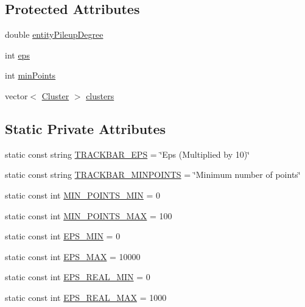 \subsection*{Protected Attributes}
\begin{DoxyCompactItemize}
\item 
double \hyperlink{classmultiscale_1_1analysis_1_1ClusterDetector_aaa93a4b3a5a3c4279aa434669093ac40}{entity\-Pileup\-Degree}
\item 
int \hyperlink{classmultiscale_1_1analysis_1_1ClusterDetector_a61e876f87d62245eada8f56d587d39cd}{eps}
\item 
int \hyperlink{classmultiscale_1_1analysis_1_1ClusterDetector_aa94df1adc462be5931ec25ba24122fe9}{min\-Points}
\item 
vector$<$ \hyperlink{classmultiscale_1_1analysis_1_1Cluster}{Cluster} $>$ \hyperlink{classmultiscale_1_1analysis_1_1ClusterDetector_aa81a8649bc743389c2fc1919d47eb5b3}{clusters}
\end{DoxyCompactItemize}
\subsection*{Static Private Attributes}
\begin{DoxyCompactItemize}
\item 
static const string \hyperlink{classmultiscale_1_1analysis_1_1ClusterDetector_a656f64f88c73c25824e5a4416a742aaf}{T\-R\-A\-C\-K\-B\-A\-R\-\_\-\-E\-P\-S} = \char`\"{}Eps (Multiplied by 10)\char`\"{}
\item 
static const string \hyperlink{classmultiscale_1_1analysis_1_1ClusterDetector_a7f0fbbf3de8479b106893c4a8161bdaf}{T\-R\-A\-C\-K\-B\-A\-R\-\_\-\-M\-I\-N\-P\-O\-I\-N\-T\-S} = \char`\"{}Minimum number of points\char`\"{}
\item 
static const int \hyperlink{classmultiscale_1_1analysis_1_1ClusterDetector_aa0219df3977a845e46be090e6c3f90ad}{M\-I\-N\-\_\-\-P\-O\-I\-N\-T\-S\-\_\-\-M\-I\-N} = 0
\item 
static const int \hyperlink{classmultiscale_1_1analysis_1_1ClusterDetector_aabb41b5c6e865ee33cbb27568cae5a2d}{M\-I\-N\-\_\-\-P\-O\-I\-N\-T\-S\-\_\-\-M\-A\-X} = 100
\item 
static const int \hyperlink{classmultiscale_1_1analysis_1_1ClusterDetector_a6c3517e03d1fd2c6b4d6cd0d81eb8684}{E\-P\-S\-\_\-\-M\-I\-N} = 0
\item 
static const int \hyperlink{classmultiscale_1_1analysis_1_1ClusterDetector_a76d0b4ecd2793d478317cc1bc856e06f}{E\-P\-S\-\_\-\-M\-A\-X} = 10000
\item 
static const int \hyperlink{classmultiscale_1_1analysis_1_1ClusterDetector_ad9542bde7e3bf36d501a0b203dc61e09}{E\-P\-S\-\_\-\-R\-E\-A\-L\-\_\-\-M\-I\-N} = 0
\item 
static const int \hyperlink{classmultiscale_1_1analysis_1_1ClusterDetector_a3e60b9e068a8addf9dd27382c74e6d62}{E\-P\-S\-\_\-\-R\-E\-A\-L\-\_\-\-M\-A\-X} = 1000
\end{DoxyCompactItemize}
